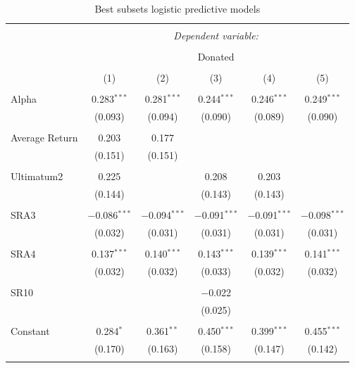 \documentclass[12pt]{article}
\begin{document}
\begin{table}[!htbp] \centering 
  \caption{Best subsets logistic predictive models} 
  \label{} 
  \begin{adjustbox}{width=\textwidth}
\begin{tabular}{@{\extracolsep{5pt}}lccccc} 
\\[-1.8ex]\hline 
\hline \\[-1.8ex] 
 & \multicolumn{5}{c}{\textit{Dependent variable:}} \\ 
\cline{2-6} 
\\[-1.8ex] & \multicolumn{5}{c}{Donated} \\ 
\\[-1.8ex] & (1) & (2) & (3) & (4) & (5)\\ 
\hline \\[-1.8ex] 
 Alpha & 0.283$^{***}$ & 0.281$^{***}$ & 0.244$^{***}$ & 0.246$^{***}$ & 0.249$^{***}$ \\ 
  & (0.093) & (0.094) & (0.090) & (0.089) & (0.090) \\ 
  & & & & & \\ 
 Average Return & 0.203 & 0.177 &  &  &  \\ 
  & (0.151) & (0.151) &  &  &  \\ 
  & & & & & \\ 
 Ultimatum2 & 0.225 &  & 0.208 & 0.203 &  \\ 
  & (0.144) &  & (0.143) & (0.143) &  \\ 
  & & & & & \\ 
 SRA3 & $-$0.086$^{***}$ & $-$0.094$^{***}$ & $-$0.091$^{***}$ & $-$0.091$^{***}$ & $-$0.098$^{***}$ \\ 
  & (0.032) & (0.031) & (0.031) & (0.031) & (0.031) \\ 
  & & & & & \\ 
 SRA4 & 0.137$^{***}$ & 0.140$^{***}$ & 0.143$^{***}$ & 0.139$^{***}$ & 0.141$^{***}$ \\ 
  & (0.032) & (0.032) & (0.033) & (0.032) & (0.032) \\ 
  & & & & & \\ 
 SR10 &  &  & $-$0.022 &  &  \\ 
  &  &  & (0.025) &  &  \\ 
  & & & & & \\ 
 Constant & 0.284$^{*}$ & 0.361$^{**}$ & 0.450$^{***}$ & 0.399$^{***}$ & 0.455$^{***}$ \\ 
  & (0.170) & (0.163) & (0.158) & (0.147) & (0.142) \\ 
  & & & & & \\ 

\end{tabular}
\end{adjustbox}
\end{table}
\end{document}
